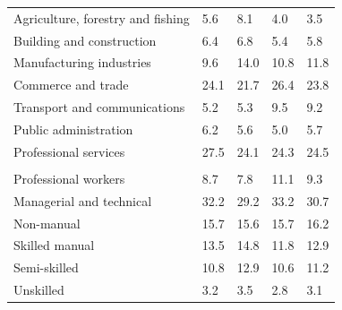 \documentclass{article}
\begin{document}
\begin{table}[h]
\begin{tabular}{KTTTT}
    \hline
Agriculture, forestry and fishing  & 5.6& 8.1& 4.0& 3.5\\
Building and construction & 6.4& 6.8& 5.4& 5.8\\
Manufacturing industries &  9.6& 14.0& 10.8& 11.8\\
Commerce and trade  & 24.1& 21.7& 26.4& 23.8\\
Transport and communications  & 5.2& 5.3& 9.5& 9.2\\
Public administration & 6.2& 5.6& 5.0& 5.7\\
Professional services & 27.5& 24.1& 24.3& 24.5\\
\hline
    \\ 
    \hline
Professional workers  &  8.7&  7.8 & 11.1&  9.3\\
Managerial and technical & 32.2& 29.2& 33.2& 30.7\\
Non-manual & 15.7& 15.6& 15.7& 16.2\\
Skilled manual & 13.5& 14.8& 11.8& 12.9\\
Semi-skilled & 10.8& 12.9& 10.6& 11.2\\
Unskilled  & 3.2& 3.5& 2.8& 3.1\\
\end{tabular}
\end{table}
\pagebreak
\end{document}
